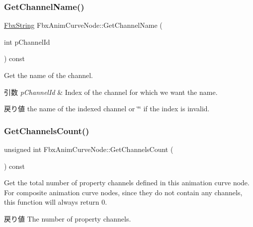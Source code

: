 \subsubsection{\texorpdfstring{Get\+Channel\+Name()}{GetChannelName()}}
{\footnotesize\ttfamily \hyperlink{class_fbx_string}{Fbx\+String} Fbx\+Anim\+Curve\+Node\+::\+Get\+Channel\+Name (\begin{DoxyParamCaption}\item[{int}]{p\+Channel\+Id }\end{DoxyParamCaption}) const}

Get the name of the channel. 
\begin{DoxyParams}{引数}
{\em p\+Channel\+Id} & Index of the channel for which we want the name. \\
\hline
\end{DoxyParams}
\begin{DoxyReturn}{戻り値}
the name of the indexed channel or \char`\"{}\char`\"{} if the index is invalid. 
\end{DoxyReturn}
\mbox{\label{class_fbx_anim_curve_node_a17a3e0fdd0cb807c3fe37f07c9bef844}} 
\subsubsection{\texorpdfstring{Get\+Channels\+Count()}{GetChannelsCount()}}
{\footnotesize\ttfamily unsigned int Fbx\+Anim\+Curve\+Node\+::\+Get\+Channels\+Count (\begin{DoxyParamCaption}{ }\end{DoxyParamCaption}) const}

Get the total number of property channels defined in this animation curve node. For composite animation curve nodes, since they do not contain any channels, this function will always return 0. \begin{DoxyReturn}{戻り値}
The number of property channels. 
\end{DoxyReturn}
\mbox{\label{class_fbx_anim_curve_node_ab9d76b0fea168dfe928ec2385e43c716}} 
